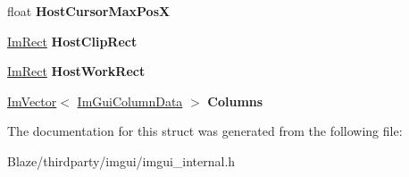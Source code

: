 \begin{DoxyCompactItemize}
\mbox{\label{structImGuiColumns_ad51ee2280dbc186c950859d036811f5b}} 
float {\bfseries Host\+Cursor\+Max\+PosX}
\item 
\mbox{\label{structImGuiColumns_aba063899508f9475697e45b1f6db6309}} 
\hyperlink{structImRect}{Im\+Rect} {\bfseries Host\+Clip\+Rect}
\item 
\mbox{\label{structImGuiColumns_a386ec5ee3875fdb4a7499ca2c2801c8b}} 
\hyperlink{structImRect}{Im\+Rect} {\bfseries Host\+Work\+Rect}
\item 
\mbox{\label{structImGuiColumns_a5b8f8832e9135db686c4eb74d01b4ce4}} 
\hyperlink{structImVector}{Im\+Vector}$<$ \hyperlink{structImGuiColumnData}{Im\+Gui\+Column\+Data} $>$ {\bfseries Columns}
\end{DoxyCompactItemize}


The documentation for this struct was generated from the following file\+:\begin{DoxyCompactItemize}
\item 
Blaze/thirdparty/imgui/imgui\+\_\+internal.\+h\end{DoxyCompactItemize}
